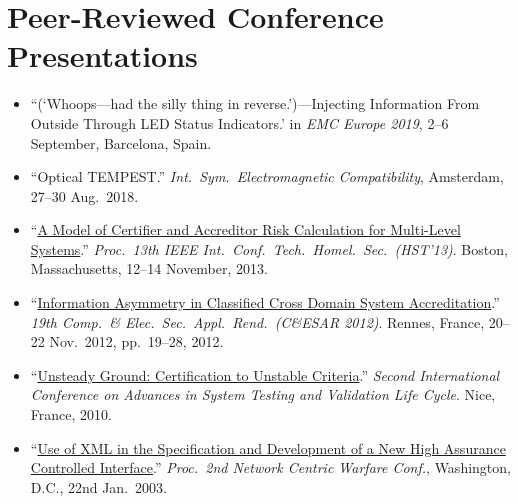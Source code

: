\section*{Peer-Reviewed Conference Presentations}
\vspace{-3mm}

\begin{itemize}
  \item ``(`Whoops---had the silly thing in reverse.')---Injecting Information
  From Outside Through LED Status Indicators.'
  in \emph{EMC Europe 2019}, 2--6 September, Barcelona, Spain.\vspace{-2.5mm}

  \item ``Optical TEMPEST.'' \emph{Int.\ Sym.\ Electromagnetic Compatibility},
    Amsterdam, 27--30 Aug.\ 2018.\vspace{-2.5mm}

	\item ``\href{http://ieeexplore.ieee.org/xpls/abs_all.jsp?arnumber=6699004}%
{A Model of Certifier and Accreditor Risk Calculation for Multi-Level
Systems}.'' \emph{Proc.\ 13th IEEE Int.\ Conf.\ Tech.\ Homel.\ Sec.\ (HST'13)}.
Boston, Massachusetts, 12--14 November, 2013.\vspace{-2.5mm}

	\item
``\href{http://cnadocs.com/papers/CESAR2012_information_asymmetry.pdf}%
{Information Asymmetry in Classified Cross Domain System Accreditation}.''
\emph{19th Comp.\ \& Elec.\ Sec.\ Appl.\ Rend.\ (C\&ESAR 2012)}. Rennes,
France, 20--22 Nov.\ 2012, pp.\ 19--28, 2012.\vspace{-2.5mm}

	\item
``\href{http://ieeexplore.ieee.org/xpl/articleDetails.jsp?arnumber=5617171}%
{Unsteady Ground: Certification to Unstable Criteria}.'' \emph{Second
International Conference on Advances in System Testing and Validation Life
Cycle}. Nice, France, 2010.\vspace{-2.5mm}


	\item ``\href{http://cnadocs.com/papers/xml_paper.pdf}%
{Use of XML in the Specification and Development of a New High Assurance
Controlled Interface}.'' \emph{Proc.\ 2nd Network Centric Warfare Conf.},
Washington, D.C., 22nd Jan.\ 2003.
\end{itemize}

